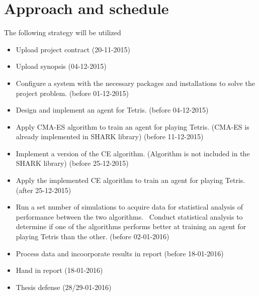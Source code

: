 \section*{Approach and schedule}
The following strategy will be utilized
\begin{itemize}
\item Upload project contract (20-11-2015)
\item Upload synopsis (04-12-2015)
\item Configure a system with the necessary packages and installations to solve the project problem. (before 01-12-2015)
\item Design and implement an agent for Tetris. (before 04-12-2015)
\item Apply CMA-ES algorithm to train an agent for playing Tetris. (CMA-ES is already implemented in SHARK library)
 (before 11-12-2015)
\item Implement a version of the CE algorithm. (Algorithm is not included in the SHARK library) (before 25-12-2015)
\item Apply the implemented CE algorithm to train an agent for playing Tetris. (after 25-12-2015)
\item Run a set number of simulations to acquire data for statistical analysis of performance between the two algorithms.
\ Conduct statistical analysis to determine if one of the algorithms performs better at training an agent for playing Tetris than the other. (before 02-01-2016)
\item Process data and incoorporate results in report (before 18-01-2016)
\item Hand in report (18-01-2016)
\item Thesis defense (28/29-01-2016)
\end{itemize}